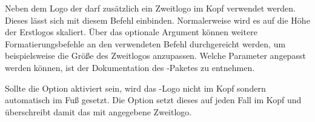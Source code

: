 \begin{Declaration}{\LParameter{}}
\printdeclarationlist%
%
%
%
Neben dem Logo der \TnUD darf zusätzlich ein Zweitlogo im Kopf verwendet 
werden. Dieses lässt sich mit diesem Befehl einbinden. Normalerweise wird es 
auf die Höhe der Erstlogos skaliert. Über das optionale Argument können weitere 
Formatierungsbefehle an den verwendeten Befehl  
durchgereicht werden, um beispielsweise die Größe des Zweitlogos anzupassen.
Welche Parameter angepasst werden können, ist der Dokumentation des
-Paketes zu entnehmen.

Sollte die Option  aktiviert sein, wird das \DDC-Logo nicht im Kopf 
sondern automatisch im Fuß gesetzt. Die Option  setzt dieses 
auf jeden Fall im Kopf und überschreibt damit das mit  
angegebene Zweitlogo.
\end{Declaration}

